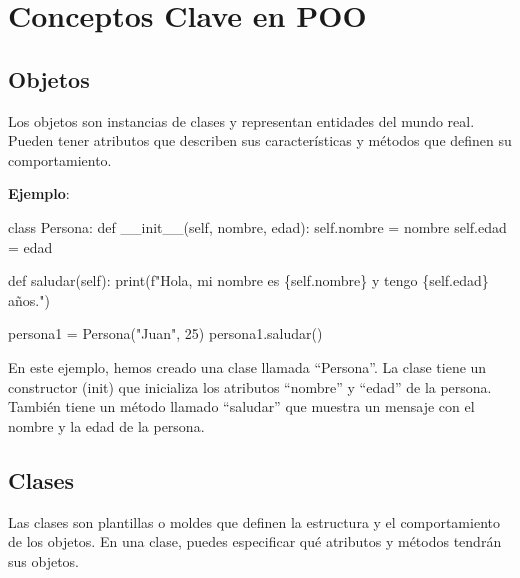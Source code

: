 \documentclass[
  a4paper,
  DIV=11,
  numbers=noendperiod,
  onepage,
  openany]{scrreprt}
\newenvironment{Shaded}{\begin{snugshade}}{\end{snugshade}}
\newcommand{\BuiltInTok}[1]{\textcolor[rgb]{0.00,0.23,0.31}{#1}}
\newcommand{\DecValTok}[1]{\textcolor[rgb]{0.68,0.00,0.00}{#1}}
\newcommand{\FunctionTok}[1]{\textcolor[rgb]{0.28,0.35,0.67}{#1}}
\newcommand{\KeywordTok}[1]{\textcolor[rgb]{0.00,0.23,0.31}{#1}}
\newcommand{\NormalTok}[1]{\textcolor[rgb]{0.00,0.23,0.31}{#1}}
\newcommand{\OperatorTok}[1]{\textcolor[rgb]{0.37,0.37,0.37}{#1}}
\newcommand{\SpecialCharTok}[1]{\textcolor[rgb]{0.37,0.37,0.37}{#1}}
\newcommand{\SpecialStringTok}[1]{\textcolor[rgb]{0.13,0.47,0.30}{#1}}
\newcommand{\StringTok}[1]{\textcolor[rgb]{0.13,0.47,0.30}{#1}}
\newcommand{\VariableTok}[1]{\textcolor[rgb]{0.07,0.07,0.07}{#1}}
\begin{document}
\section{Conceptos Clave en POO}\label{conceptos-clave-en-poo}

\subsection{Objetos}\label{objetos}

Los objetos son instancias de clases y representan entidades del mundo
real. Pueden tener atributos que describen sus características y métodos
que definen su comportamiento.

\textbf{Ejemplo}:

\begin{Shaded}
\begin{Highlighting}[]
\KeywordTok{class}\NormalTok{ Persona:}
    \KeywordTok{def} \FunctionTok{\_\_init\_\_}\NormalTok{(}\VariableTok{self}\NormalTok{, nombre, edad):}
        \VariableTok{self}\NormalTok{.nombre }\OperatorTok{=}\NormalTok{ nombre}
        \VariableTok{self}\NormalTok{.edad }\OperatorTok{=}\NormalTok{ edad}

    \KeywordTok{def}\NormalTok{ saludar(}\VariableTok{self}\NormalTok{):}
        \BuiltInTok{print}\NormalTok{(}\SpecialStringTok{f"Hola, mi nombre es }\SpecialCharTok{\{}\VariableTok{self}\SpecialCharTok{.}\NormalTok{nombre}\SpecialCharTok{\}}\SpecialStringTok{ y tengo }\SpecialCharTok{\{}\VariableTok{self}\SpecialCharTok{.}\NormalTok{edad}\SpecialCharTok{\}}\SpecialStringTok{ años."}\NormalTok{)}

\NormalTok{persona1 }\OperatorTok{=}\NormalTok{ Persona(}\StringTok{"Juan"}\NormalTok{, }\DecValTok{25}\NormalTok{)}
\NormalTok{persona1.saludar()}
\end{Highlighting}
\end{Shaded}

En este ejemplo, hemos creado una clase llamada ``Persona''. La clase
tiene un constructor (init) que inicializa los atributos ``nombre'' y
``edad'' de la persona. También tiene un método llamado ``saludar'' que
muestra un mensaje con el nombre y la edad de la persona.

\subsection{Clases}\label{clases}

Las clases son plantillas o moldes que definen la estructura y el
comportamiento de los objetos. En una clase, puedes especificar qué
atributos y métodos tendrán sus objetos.
\end{document}
